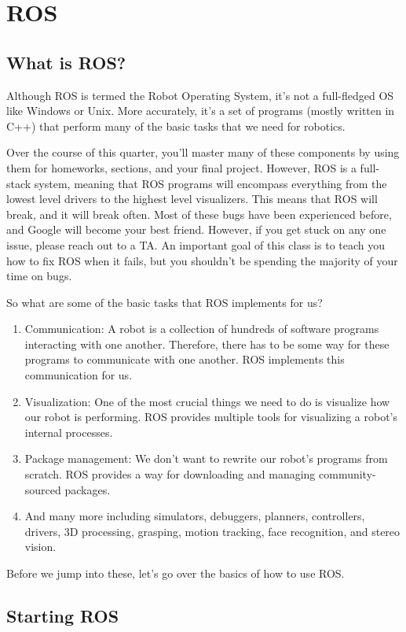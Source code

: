 \section{ROS}
\subsection{What is ROS?}
Although ROS is termed the Robot Operating System, it's not a full-fledged OS like Windows or Unix. More accurately, it's a set of programs (mostly written in C++) that perform many of the basic tasks that we need for robotics. 

Over the course of this quarter, you'll master many of these components by using them for homeworks, sections, and your final project. However, ROS is a full-stack system, meaning that ROS programs will encompass everything from the lowest level drivers to the highest level visualizers. This means that ROS will break, and it will break often. Most of these bugs have been experienced before, and Google will become your best friend. However, if you get stuck on any one issue, please reach out to a TA. An important goal of this class is to teach you how to fix ROS when it fails, but you shouldn't be spending the majority of your time on bugs. 

So what are some of the basic tasks that ROS implements for us?
\begin{enumerate}
\item Communication: A robot is a collection of hundreds of software programs interacting with one another. Therefore, there has to be some way for these programs to communicate with one another. ROS implements this communication for us.
\item Visualization: One of the most crucial things we need to do is visualize how our robot is performing. ROS provides multiple tools for visualizing a robot's internal processes.
\item Package management: We don't want to rewrite our robot's programs from scratch. ROS provides a way for downloading and managing community-sourced packages.
\item And many more including simulators, debuggers, planners, controllers, drivers, 3D processing, grasping, motion tracking, face recognition, and stereo vision.
\end{enumerate}

Before we jump into these, let's go over the basics of how to use ROS.
\subsection{Starting ROS}

